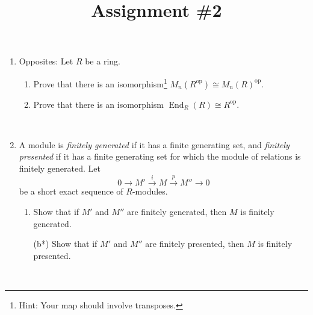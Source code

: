\documentclass{amsart}[12pt]
\title{Assignment \#2}
\def\End{\operatorname{End}}
\numberwithin{equation}{section}
\theoremstyle{plain} %
\theoremstyle{definition}
\theoremstyle{remark}
\newcommand{\xra}[1]{\xrightarrow{#1}}
\begin{document}
\onehalfspacing

\maketitle




\begin{enumerate}

\item Opposites: Let $R$ be a ring.
\begin{enumerate}
\item Prove that there is an isomorphism\footnote{Hint: Your map should involve transposes.} $M_n(R^\mathrm{op}) \cong M_n(R)^{\mathrm{op}}$.
\item Prove that there is an isomorphism $\End_R(R) \cong R^{\mathrm{op}}$.
\end{enumerate}

\

\item A module is \emph{finitely generated} if it has a finite generating set, and \emph{finitely presented} if it has a finite generating set for which the module of relations is finitely generated. Let 
\[0 \to M' \xra{i} M \xra{p} M'' \to 0\] be a short exact sequence of $R$-modules.
\begin{enumerate}
\item Show that if $M'$ and $M''$ are finitely generated, then $M$ is finitely generated.
\item[(b*)] Show that if $M'$ and $M''$ are finitely presented, then $M$ is finitely presented. 
\end{enumerate}

\



\end{enumerate}
\end{document}
